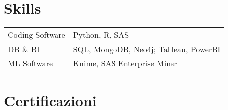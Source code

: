 \documentclass[a4paper,12pt]{article}
\begin{document}
%

\section{Skills}
\begin{tabularx}{\linewidth}{@{}l X@{}}
Coding Software &  \normalsize{Python, R, SAS}\\
DB \& BI  &  \normalsize{SQL, MongoDB, Neo4j; Tableau, PowerBI}\\
ML Software &  \normalsize{Knime, SAS Enterprise Miner}\\  

\end{tabularx}


\section{Certificazioni}
\begin{refsection}
\nocite{*}
\printbibliography[heading=none]
\end{refsection}



\vfill
\end{document}
